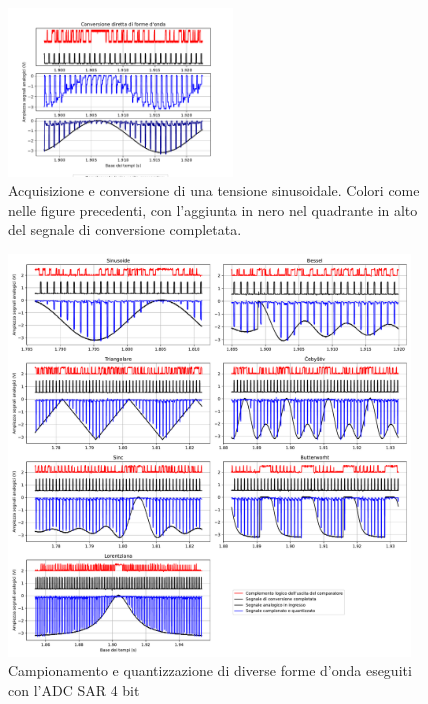 \documentclass[journal]{IEEEtran}
\begin{document}
\begin{figure}[H]%
\begin{center}
\includegraphics[trim = {0 25 0 0},clip, width=0.53\textwidth]{analysis/output/direct_aq_waveforms.pdf}
\caption{Acquisizione e conversione di una tensione sinusoidale. Colori come nelle figure precedenti, con l'aggiunta in nero nel quadrante in alto del segnale di conversione completata.}
\label{fig:Direct_aq_waveforms}
\end{center}
\end{figure}

\clearpage

\begin{figure}[t]%
\centering
\includegraphics[trim = {30 0 50 0}, width=0.95\textwidth]{analysis/output/waveforms.pdf}
\caption{Campionamento e quantizzazione di diverse forme d'onda eseguiti con l'ADC SAR 4 bit}
\label{fig:waveforms_no_sh_scope}
\end{figure}
\end{document}
